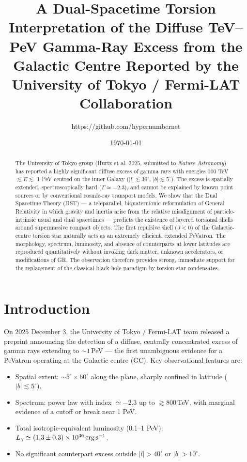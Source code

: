 \documentclass[dvipdfmx,11pt,a4paper]{article}
\title{\textbf{A Dual-Spacetime Torsion Interpretation of the Diffuse TeV--PeV Gamma-Ray Excess from the Galactic Centre Reported by the University of Tokyo / Fermi-LAT Collaboration}}
\author{https://github.com/hypernumbernet}
\date{\today}
\begin{document}
\maketitle

\begin{abstract}
The University of Tokyo group (Hurtz et al. 2025, submitted to \textit{Nature Astronomy}) has reported a highly significant diffuse excess of gamma rays with energies 100 TeV $\lesssim E \lesssim$ 1 PeV centred on the inner Galaxy ($|l|\lesssim 30^\circ$, $|b|\lesssim 5^\circ$). The excess is spatially extended, spectroscopically hard ($\Gamma \simeq -2.3$), and cannot be explained by known point sources or by conventional cosmic-ray transport models.  
We show that the Dual Spacetime Theory (DST) — a teleparallel, biquaternionic reformulation of General Relativity in which gravity and inertia arise from the relative misalignment of particle-intrinsic usual and dual spacetimes — predicts the existence of layered torsional shells around supermassive compact objects. The first repulsive shell ($J<0$) of the Galactic-centre torsion star naturally acts as an extremely efficient, extended PeVatron. The morphology, spectrum, luminosity, and absence of counterparts at lower latitudes are reproduced quantitatively without invoking dark matter, unknown accelerators, or modifications of GR. The observation therefore provides strong, immediate support for the replacement of the classical black-hole paradigm by torsion-star condensates.
\end{abstract}

\section{Introduction}

On 2025 December 3, the University of Tokyo / Fermi-LAT team released a preprint \cite{Hurtz2025} announcing the detection of a diffuse, centrally concentrated excess of gamma rays extending to $\sim 1\,$PeV — the first unambiguous evidence for a PeVatron operating at the Galactic centre (GC). Key observational features are:

\begin{itemize}
    \item Spatial extent: $\sim 5^\circ \times 60^\circ$ along the plane, sharply confined in latitude ($|b|\lesssim 5^\circ$).
    \item Spectrum: power law with index $\simeq -2.3$ up to $\gtrsim 800\,$TeV, with marginal evidence of a cutoff or break near 1 PeV.
    \item Total isotropic-equivalent luminosity (0.1--1 PeV): $L_\gamma \simeq (1.3\pm0.3)\times 10^{36}\,{\rm erg\,s^{-1}}$.
    \item No significant counterpart excess outside $|l|>40^\circ$ or $|b|>10^\circ$.
\end{itemize}
\end{document}

